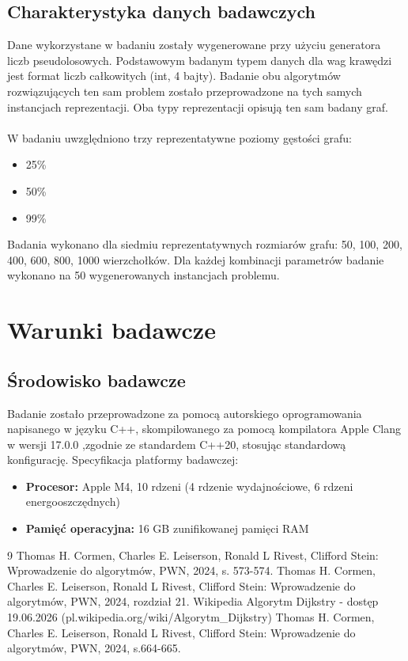 \documentclass{article}
\theoremstyle{mytheoremstyle}
\theoremstyle{mytheoremstyle}
\theoremstyle{myproblemstyle}
\begin{document}
 \subsection{Charakterystyka danych badawczych}
 Dane wykorzystane w badaniu zostały wygenerowane przy użyciu generatora liczb pseudolosowych. Podstawowym badanym typem danych dla wag krawędzi jest format liczb całkowitych (int, 4 bajty).
 Badanie obu algorytmów rozwiązujących ten sam problem zostało przeprowadzone na tych samych instancjach reprezentacji. Oba typy reprezentacji opisują ten sam badany graf.\\
 \\
 W badaniu uwzględniono trzy reprezentatywne poziomy gęstości grafu:
 \begin{itemize}
   \item{25\%}
   \item{50\%}
   \item{99\%}
 \end{itemize}
 Badania wykonano dla siedmiu reprezentatywnych rozmiarów grafu: 50, 100, 200, 400, 600, 800, 1000 wierzchołków.
 Dla każdej kombinacji parametrów badanie wykonano na 50 wygenerowanych instancjach problemu.
 \section{Warunki badawcze}
  \subsection{Środowisko badawcze}
  Badanie zostało przeprowadzone za pomocą autorskiego oprogramowania napisanego w języku
C++, skompilowanego za pomocą kompilatora Apple Clang w wersji 17.0.0 ,zgodnie ze standardem C++20, stosując standardową konfigurację. Specyfikacja platformy badawczej:
  \begin{itemize}
    \item{\textbf{Procesor:} Apple M4, 10 rdzeni (4 rdzenie wydajnościowe, 6 rdzeni energooszczędnych)}
    \item{\textbf{Pamięć operacyjna:} 16 GB zunifikowanej pamięci RAM}
  \end{itemize}
 \begin{thebibliography}{9}
 Thomas H. Cormen, Charles E. Leiserson, Ronald L Rivest, Clifford Stein: Wprowadzenie do algorytmów, PWN, 2024, s. 573-574.
  Thomas H. Cormen, Charles E. Leiserson, Ronald L Rivest, Clifford Stein: Wprowadzenie do algorytmów, PWN, 2024, rozdział 21.
  Wikipedia Algorytm Dijkstry - dostęp 19.06.2026 (pl.wikipedia.org/wiki/Algorytm\_Dijkstry)
 Thomas H. Cormen, Charles E. Leiserson, Ronald L Rivest, Clifford Stein: Wprowadzenie do algorytmów, PWN, 2024, s.664-665.
\end{thebibliography}
\end{document}
